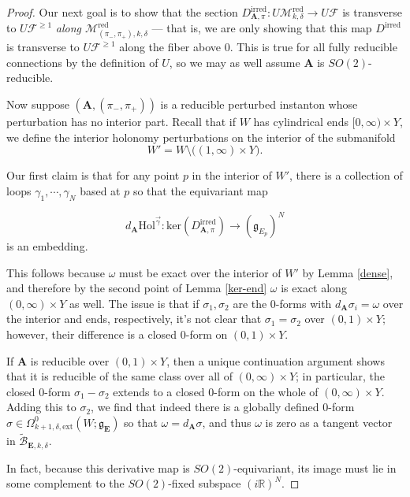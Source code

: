 \documentclass[10pt,a4paper]{amsart}
\theoremstyle{definition}
\theoremstyle{remark}
\numberwithin{figure}{qchap}
\begin{document}
\begin{proof}
Our next goal is to show that the section $D^{\text{irred}}_{\mathbf{A},\pi}: U\mathcal M^{\text{red}}_{k,\delta} \to U\mathcal F$ is transverse to $U\mathcal F^{\geq 1}$ \emph{along $\mathcal M^{\text{red}}_{(\pi_-,\pi_+), k, \delta}$} --- that is, we are only showing that this map $D^{\text{irred}}$ is transverse to $U\mathcal F^{\geq 1}$ along the fiber above $0$. This is true for all fully reducible connections by the definition of $U$, so we may as well assume $\mathbf{A}$ is $SO(2)$-reducible.

Now suppose $(\mathbf{A},(\pi_-, \pi_+))$ is a reducible perturbed instanton whose perturbation has no interior part. Recall that if $W$ has cylindrical ends $[0,\infty) \times Y$, we define the interior holonomy perturbations on the interior of the submanifold
$$W' = W \setminus \big((1,\infty) \times Y\big).$$

Our first claim is that for any point $p$ in the interior of $W'$, there is a collection of loops $\gamma_1, \cdots, \gamma_N$ based at $p$ so that the equivariant map

$$d_{\mathbf{A}}\text{Hol}^{\vec \gamma}: \text{ker}(D^{\text{irred}}_{\mathbf{A},\pi}) \to (\mathfrak g_{E_p})^N$$ is an embedding.

This follows because $\omega$ must be exact over the interior of $W'$ by Lemma \ref{dense}, and therefore by the second point of Lemma \ref{ker-end} $\omega$ is exact along $(0,\infty) \times Y$ as well. The issue is that if $\sigma_1, \sigma_2$ are the 0-forms with $d_{\mathbf{A}} \sigma_i = \omega$ over the interior and ends, respectively, it's not clear that $\sigma_1 = \sigma_2$ over $(0,1) \times Y$; however, their difference is a closed 0-form on $(0,1) \times Y$.

If $\mathbf{A}$ is reducible over $(0,1) \times Y$, then a unique continuation argument shows that it is reducible of the same class over all of $(0,\infty) \times Y$; in particular, the closed $0$-form $\sigma_1 - \sigma_2$ extends to a closed 0-form on the whole of $(0,\infty) \times Y$. Adding this to $\sigma_2$, we find that indeed there is a globally defined 0-form $\sigma \in \Omega^0_{k+1,\delta,\text{ext}}(W;\mathfrak g_{\mathbf{E}})$ so that $\omega = d_{\mathbf{A}} \sigma$, and thus $\omega$ is zero as a tangent vector in $\widetilde{\mathcal B}_{\mathbf{E},k,\delta}.$

In fact, because this derivative map is $SO(2)$-equivariant, its image must lie in some complement to the $SO(2)$-fixed subspace $(i\mathbb R)^N$.


\end{proof}
\end{document}
